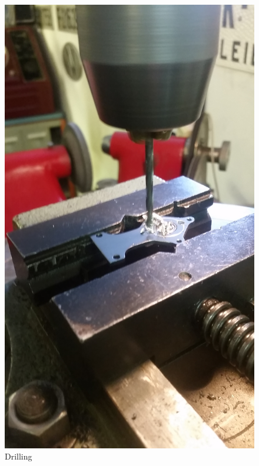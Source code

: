 \begin{figure}[H]
        \centering
         \begin{minipage}[b]{0,35\textwidth}
            \includegraphics[width =\textwidth, angle =270]{VAPIQ-PICTURES/Drilling}
              \caption{Drilling}
        \end{minipage}
        \hfill
        \begin{minipage}[b]{0.35\textwidth}

\end{minipage}
\end{figure}

